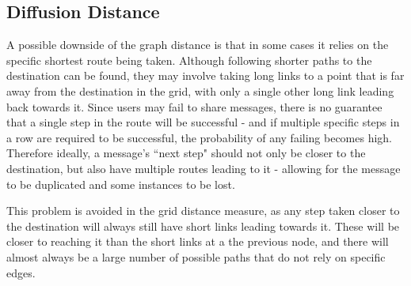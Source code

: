 \documentclass[bsc,frontabs,twoside,singlespacing,parskip,deptreport]{infthesis}     %
\begin{document}
\subsection{Diffusion Distance} \label{subsec:diffusion_dist}

A possible downside of the graph distance is that in some cases it relies on the specific shortest route being taken. Although following shorter paths to the destination can be found, they may involve taking long links to a point that is far away from the destination in the grid, with only a single other long link leading back towards it. Since users may fail to share messages, there is no guarantee that a single step in the route will be successful - and if multiple specific steps in a row are required to be successful, the probability of any failing becomes high. Therefore ideally, a message's ``next step" should not only be closer to the destination, but also have multiple routes leading to it - allowing for the message to be duplicated and some instances to be lost.

This problem is avoided in the grid distance measure, as any step taken closer to the destination will always still have short links leading towards it. These will be closer to reaching it than the short links at a the previous node, and there will almost always be a large number of possible paths that do not rely on specific edges.
\end{document}
